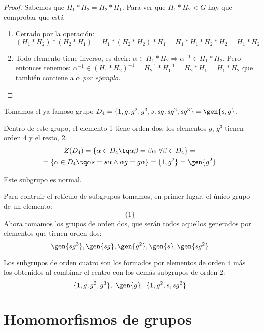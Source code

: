\documentclass[nochap]{apuntes}
\begin{document}
 \begin{proof}
  Sabemos que $H_{1}\ast H_{2}=H_{2}\ast H_{1}$. Para ver que $H_{1}\ast H_{2}<G$  hay que comprobar que está
  \begin{enumerate}
   \item Cerrado por la operación: $(H_{1}\ast H_{2})\ast (H_{2}\ast H_{1})=H_{1}\ast (H_{2}\ast H_{2})\ast H_{1}=H_{1}\ast H_{1}\ast H_{2}\ast H_{2}=H_{1}\ast H_{2}$
   \item Todo elemento tiene inverso, es decir: $\alpha\in H_{1}\ast H_{2}\Rightarrow \alpha^{-1}\in H_{1}\ast H_{2}$. Pero entonces tenemos:
   $\alpha^{-1}\in (H_{1}\ast H_{2})^{-1} = H_{2}^{-1}\ast H_{1}^{-1}=H_{2}\ast H_{1}=H_{1}\ast H_{2}$ que también contiene a $\alpha$ \textit{por ejemplo.}
  \end{enumerate}

 \end{proof}

 \begin{example}
  Tomamos el ya famoso grupo $D_{4}=\{1,g,g^{2},g^{3}, s, sg, sg^{2}, sg^{3}\}=\gen{s,g}$.
  
  Dentro de este grupo, el elemento 1 tiene orden dos, los elementos $g$, $g^{3}$  tienen orden 4 y el resto, 2.
  \begin{gather*}
  Z(D_{4})= \{\alpha\in D_{4} \tq \alpha\beta=\beta\alpha \ \forall \beta \in D_{4}\}= \\
  = \{\alpha\in D_{4}\tq \alpha s = s\alpha \wedge \alpha g = g\alpha\}=\{1, g^{2}\}=\gen{g^{2}}
  \end{gather*} 
  
  Este subgrupo es normal.
  
  Para contruir el retículo de subgrupos tomamos, en primer lugar, el único grupo de un elemento: 
  \[ \{1\} \]
  Ahora tomamos los grupos de orden dos, que serán todos aquellos generados por elementos que tienen orden dos:\\
  \[ \gen{sg^{3}}, \gen{sg}, \gen{g^{2}}, \gen{s}, \gen{sg^{2}} \]
  
  Los subgrupos de orden cuatro son los formados por elementos de orden 4 más los obtenidos al combinar el centro con los demás subgrupos de orden 2:
  \[ \{1,g,g^{2},g^{3}\}, \ \gen{g}, \ \{1, g^{2}, s, sg^{2}\} \]
 \end{example}
  
\section{Homomorfismos de grupos}
\end{document}
